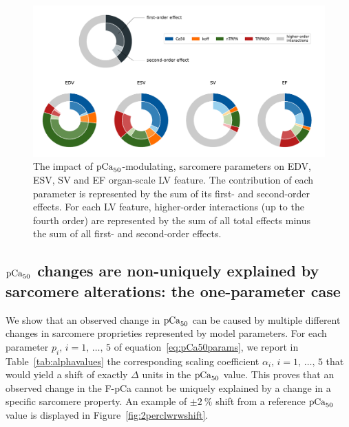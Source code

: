 \begin{figure}[h!]
    \myfloatalign
    \includegraphics[width=\textwidth]{figures/chapter08/Fig3.pdf}
    \caption{The impact of $\textrm{pCa}_{50}$-modulating, sarcomere parameters on EDV, ESV, SV and EF organ-scale LV feature. The contribution of each parameter is represented by the sum of its first- and second-order effects. For each LV feature, higher-order interactions (up to the fourth order) are represented by the sum of all total effects minus the sum of all first- and second-order effects.}
    \label{fig:gsarestr}
\end{figure}


%
%
%
\subsection{$\textrm{pCa}_{50}$ changes are non-uniquely explained by sarcomere alterations: the one-parameter case}\label{sec:changespCa50result1}
We show that an observed change in $\textrm{pCa}_{50}$ can be caused by multiple different changes in sarcomere proprieties represented by model parameters. For each parameter $p_i,\,i=1,\,\dots,\,5$ of equation~\eqref{eq:pCa50params}, we report in Table~\ref{tab:alphavalues} the corresponding scaling coefficient $\alpha_i,\,i=1,\,\dots,\,5$ that would yield a shift of exactly $\Delta$ units in the $\textrm{pCa}_{50}$ value. This proves that an observed change in the F-pCa cannot be uniquely explained by a change in a specific sarcomere property. An example of $\pm\SI{2}{\percent}$ shift from a reference $\textrm{pCa}_{50}$ value is displayed in Figure~\ref{fig:2perclwrwshift}.

